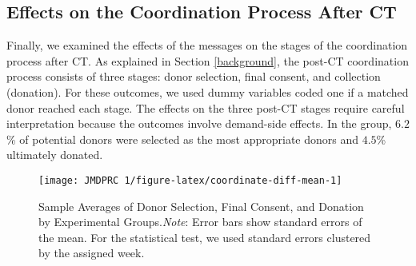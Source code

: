 \documentclass[12pt, a4paper]{article}
\newcommand{\revise}[1]{{\color{red}{#1}}}
\begin{document}
\hypertarget{process}{%
\subsection{Effects on the Coordination Process After CT}\label{process}}

Finally, we examined the effects of the messages on the stages of the coordination process after CT. As explained in Section \ref{background}, the post-CT coordination process consists of three stages: donor selection, final consent, and collection (donation). For these outcomes, we used dummy variables coded one if a matched donor reached each stage. The effects on the three post-CT stages require careful interpretation because the outcomes involve demand-side effects. In the \revise{StatusQuo} group, \(6.2\)\% of potential donors were selected as the most appropriate donors and \(4.5\)\% ultimately donated.

\begin{figure}[t]
\texttt{[image: JMDPRC~1/figure-latex/coordinate-diff-mean-1]} \caption{Sample Averages of Donor Selection, Final Consent, and Donation by Experimental Groups.\newline \emph{Note}: Error bars show standard errors of the mean. For the statistical test, we used standard errors clustered by the assigned week.}\label{fig:coordinate-diff-mean}
\end{figure}
\end{document}

